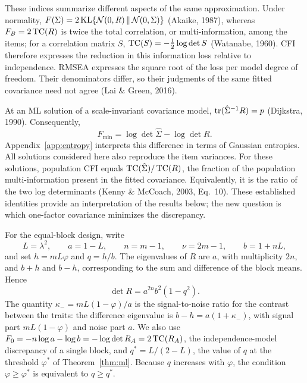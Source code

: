 These indices summarize different aspects of the same approximation. Under normality, $F(\Sigma)=2\operatorname{KL}\{\mathcal N(0,R)\,\|\,\mathcal N(0,\Sigma)\}$ (Akaike, 1987), whereas $F_B=2\operatorname{TC}(R)$ is twice the total correlation, or multi-information, among the items; for a correlation matrix $S$, $\operatorname{TC}(S)=-\tfrac12\log\det S$ (Watanabe, 1960). CFI therefore expresses the reduction in this information loss relative to independence. RMSEA expresses the square root of the loss per model degree of freedom. Their denominators differ, so their judgments of the same fitted covariance need not agree (Lai \& Green, 2016).

At an ML solution of a scale-invariant covariance model, $\operatorname{tr}(\hat\Sigma^{-1}R)=p$ (Dijkstra, 1990). Consequently,
\begin{equation}
F_{\min}=\log\det\hat\Sigma-\log\det R.
\label{eq:entropy-gap}
\end{equation}
Appendix~\ref{app:entropy} interprets this difference in terms of Gaussian entropies. All solutions considered here also reproduce the item variances. For these solutions, population CFI equals $\operatorname{TC}(\hat\Sigma)/\operatorname{TC}(R)$, the fraction of the population multi-information present in the fitted covariance. Equivalently, it is the ratio of the two log determinants (Kenny \& McCoach, 2003, Eq.~10). These established identities provide an interpretation of the results below; the new question is which one-factor covariance minimizes the discrepancy.

For the equal-block design, write
\[
L=\lambda^2,\qquad a=1-L,\qquad n=m-1,\qquad
\nu =2m-1,\qquad b=1+nL,
\]
and set $h=mL\varphi$ and $q=h/b$. The eigenvalues of $R$ are $a$, with multiplicity $2n$, and $b+h$ and $b-h$, corresponding to the sum and difference of the block means. Hence
\[
\det R=a^{2n}b^2(1-q^2).
\]
The quantity $\kappa_-=mL(1-\varphi)/a$ is the signal-to-noise ratio for the contrast between the traits: the difference eigenvalue is $b-h=a(1+\kappa_-)$, with signal part $mL(1-\varphi)$ and noise part $a$. We also use $F_0=-n\log a-\log b=-\log\det R_A=2\operatorname{TC}(R_A)$, the independence-model discrepancy of a single block, and $q^*=L/(2-L)$, the value of $q$ at the threshold $\varphi^*$ of Theorem~\ref{thm:ml}. Because $q$ increases with $\varphi$, the condition $\varphi\ge\varphi^*$ is equivalent to $q\ge q^*$.
